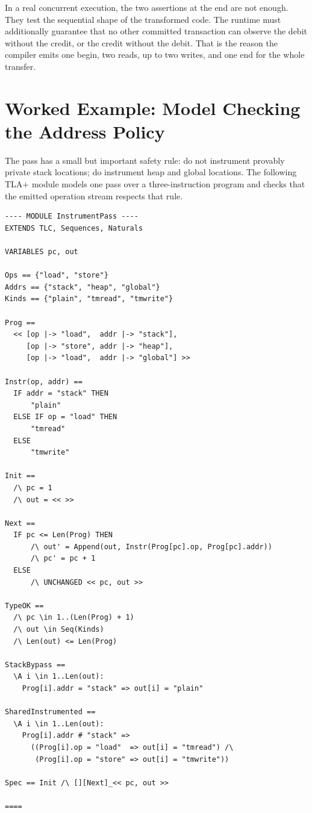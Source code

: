 In a real concurrent execution, the two assertions at the end are not enough. They test the sequential shape of the transformed code. The runtime must additionally guarantee that no other committed transaction can observe the debit without the credit, or the credit without the debit. That is the reason the compiler emits one begin, two reads, up to two writes, and one end for the whole transfer.

\section{Worked Example: Model Checking the Address Policy}
\label{sec:address-policy-tla}

The pass has a small but important safety rule: do not instrument provably
private stack locations; do instrument heap and global locations. The following
TLA+ module models one pass over a three-instruction program and checks that
the emitted operation stream respects that rule.

\begin{lstlisting}[caption={TLA+ model of the stack-bypass/shared-instrument policy.}]
---- MODULE InstrumentPass ----
EXTENDS TLC, Sequences, Naturals

VARIABLES pc, out

Ops == {"load", "store"}
Addrs == {"stack", "heap", "global"}
Kinds == {"plain", "tmread", "tmwrite"}

Prog ==
  << [op |-> "load",  addr |-> "stack"],
     [op |-> "store", addr |-> "heap"],
     [op |-> "load",  addr |-> "global"] >>

Instr(op, addr) ==
  IF addr = "stack" THEN
      "plain"
  ELSE IF op = "load" THEN
      "tmread"
  ELSE
      "tmwrite"

Init ==
  /\ pc = 1
  /\ out = << >>

Next ==
  IF pc <= Len(Prog) THEN
      /\ out' = Append(out, Instr(Prog[pc].op, Prog[pc].addr))
      /\ pc' = pc + 1
  ELSE
      /\ UNCHANGED << pc, out >>

TypeOK ==
  /\ pc \in 1..(Len(Prog) + 1)
  /\ out \in Seq(Kinds)
  /\ Len(out) <= Len(Prog)

StackBypass ==
  \A i \in 1..Len(out):
    Prog[i].addr = "stack" => out[i] = "plain"

SharedInstrumented ==
  \A i \in 1..Len(out):
    Prog[i].addr # "stack" =>
      ((Prog[i].op = "load"  => out[i] = "tmread") /\
       (Prog[i].op = "store" => out[i] = "tmwrite"))

Spec == Init /\ [][Next]_<< pc, out >>

====
\end{lstlisting}

